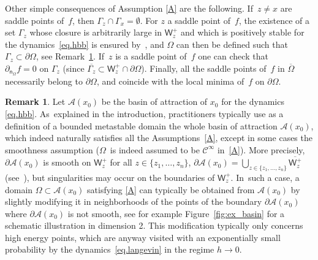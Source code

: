 \documentclass[10pt]{amsart}
\let\pa\partial
\theoremstyle{plain}
\theoremstyle{definition}
\newtheorem{remark}[proposition]{Remark}
\begin{document}
Other simple consequences of Assumption \ref{A} are the following. If~$z\neq x$ are saddle
points of~$f$, then $\Gamma_z\cap \Gamma_x=\emptyset$. For $z$ a
saddle point of~$f$, the existence of a set $\Gamma_z$ whose
closure is arbitrarily large in $\mathsf W_z^+$ and which is
positively stable for the dynamics~\eqref{eq.hbb} is ensured
by~\cite[Prop.\,80]{DLLN}, and $\Omega$ can then be defined such
that $\Gamma_z \subset \partial \Omega$, see Remark~\ref{rem:smooth_basin}. If~$z$ is a saddle point of~$f$ one can check that
$\partial_{\mathsf n_\Omega} f=0\text{ on } \Gamma_z$ (since $\overline{\Gamma_z}\subset \mathsf W_z^+\cap \partial \Omega$).
Finally, all the saddle points of~$f$ in
$\overline{\Omega}$ necessarily belong to $\partial \Omega$, and
coincide with the local minima of~$f$ on $\partial \Omega$.

\begin{remark}\label{rem:smooth_basin} Let $\mathcal A(x_0)$ be the basin of attraction of $x_0$ for the
dynamics \eqref{eq.hbb}. As~explained in the
introduction, practitioners typically use as a definition
of a bounded metastable domain the whole basin of attraction $\mathcal
A(x_0)$, which indeed naturally satisfies all the Assumptions~\ref{A},
except in some cases the smoothness assumption ($\Omega$~is indeed assumed
to be $\mathcal C^\infty$ in~\ref{A}). More precisely, $\pa \mathcal A(x_0)$ is
smooth on $\mathsf W_z^+$ for all $z \in
\{z_1,\ldots,z_n\}$, $\pa \mathcal A(x_0)=\bigcup_{z \in
\{z_1,\ldots,z_n\}} \overline{\mathsf W_z^+}$ (see~\cite[Th.\,B.13]{menz-schlichting-14}), but singularities may occur on the
boundaries of $\mathsf W_z^+$. In~such a case, a domain $\Omega \subset \mathcal
A(x_0)$ satisfying \ref{A} can typically be obtained from $\mathcal
A(x_0)$ by slightly modifying it in neighborhoods
of the points of the boundary $\pa \mathcal A(x_0)$ where $\pa \mathcal
A(x_0)$ is not smooth, see for example Figure~\ref{fig:ex_basin} for
a schematic illustration in dimension 2. This modification typically only
concerns high energy points, which are anyway visited with an
exponentially small probability by the dynamics~\eqref{eq.langevin}
in the regime $h \to 0$.

\begin{figure}
\begin{center}
\end{center}
\end{figure}
\end{remark}
\end{document}
